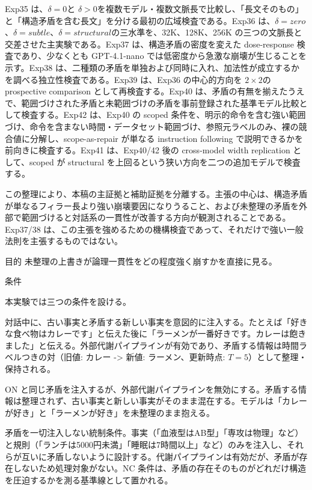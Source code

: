 \documentclass[12pt,a4paper]{article}
\begin{document}
Exp35 は、\(\delta=0\)と \(\delta>0\)を複数モデル・複数文脈長で比較し、「長文そのもの」と「構造矛盾を含む長文」を分ける最初の広域検査である。Exp36 は、\(\delta=zero\)、\(\delta=subtle\)、\(\delta=structural\)の三水準を、32K、128K、256K の三つの文脈長と交差させた主実験である。Exp37 は、構造矛盾の密度を変えた dose-response 検査であり、少なくとも GPT-4.1-nano では低密度から急激な崩壊が生じることを示す。Exp38 は、二種類の矛盾を単独および同時に入れ、加法性が成立するかを調べる独立性検査である。Exp39 は、Exp36 の中心的方向を \(2\times2\)の prospective comparison として再検査する。Exp40 は、矛盾の有無を揃えたうえで、範囲づけされた矛盾と未範囲づけの矛盾を事前登録された基準モデル比較として検査する。Exp42 は、Exp40 の scoped 条件を、明示的命令を含む強い範囲づけ、命令を含まない時間・データセット範囲づけ、参照元ラベルのみ、裸の競合値に分解し、scope-as-repair が単なる instruction following で説明できるかを前向きに検査する。Exp41 は、Exp40/42 後の cross-model width replication として、scoped が structural を上回るという狭い方向を二つの追加モデルで検査する。

この整理により、本稿の主証拠と補助証拠を分離する。主張の中心は、構造矛盾が単なるフィラー長より強い崩壊要因になりうること、および未整理の矛盾を外部で範囲づけると対話系の一貫性が改善する方向が観測されることである。Exp37/38 は、この主張を強めるための機構検査であって、それだけで強い一般法則を主張するものではない。

目的 未整理の上書きが論理一貫性をどの程度強く崩すかを直接に見る。

条件

本実験では三つの条件を設ける。

\begin{definition}
対話中に、古い事実と矛盾する新しい事実を意図的に注入する。たとえば「好きな食べ物はカレーです」と伝えた後に「ラーメンが一番好きです。カレーは飽きました」と伝える。外部代謝パイプラインが有効であり、矛盾する情報は時間ラベルつきの対（旧値: カレー -> 新値: ラーメン、更新時点: $T=5$）として整理・保持される。
\end{definition}

\begin{definition}
ON と同じ矛盾を注入するが、外部代謝パイプラインを無効にする。矛盾する情報は整理されず、古い事実と新しい事実がそのまま混在する。モデルは「カレーが好き」と「ラーメンが好き」を未整理のまま抱える。
\end{definition}

\begin{definition}
矛盾を一切注入しない統制条件。事実（「血液型はAB型」「専攻は物理」など）と規則（「ランチは5000円未満」「睡眠は7時間以上」など）のみを注入し、それらが互いに矛盾しないように設計する。代謝パイプラインは有効だが、矛盾が存在しないため処理対象がない。NC 条件は、矛盾の存在そのものがどれだけ構造を圧迫するかを測る基準線として置かれる。
\end{definition}
\end{document}
